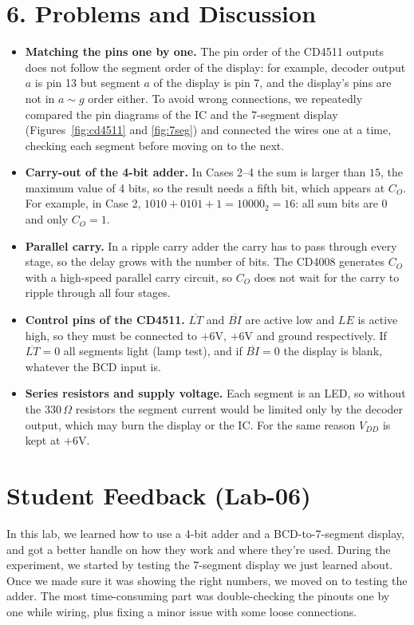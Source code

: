 \section*{6. Problems and Discussion}
\begin{itemize}[leftmargin=*]
    \item \textbf{Matching the pins one by one.} The pin order of the CD4511 outputs does not follow the segment order of the display: for example, decoder output $a$ is pin 13 but segment $a$ of the display is pin 7, and the display's pins are not in $a \sim g$ order either. To avoid wrong connections, we repeatedly compared the pin diagrams of the IC and the 7-segment display (Figures~\ref{fig:cd4511} and \ref{fig:7seg}) and connected the wires one at a time, checking each segment before moving on to the next.
    \item \textbf{Carry-out of the 4-bit adder.} In Cases 2--4 the sum is larger than $15$, the maximum value of 4 bits, so the result needs a fifth bit, which appears at $C_O$. For example, in Case 2, $1010 + 0101 + 1 = 10000_2 = 16$: all sum bits are 0 and only $C_O = 1$.
    \item \textbf{Parallel carry.} In a ripple carry adder the carry has to pass through every stage, so the delay grows with the number of bits. The CD4008 generates $C_O$ with a high-speed parallel carry circuit, so $C_O$ does not wait for the carry to ripple through all four stages.
    \item \textbf{Control pins of the CD4511.} $\overline{LT}$ and $\overline{BI}$ are active low and $LE$ is active high, so they must be connected to $+6\text{V}$, $+6\text{V}$ and ground respectively. If $\overline{LT} = 0$ all segments light (lamp test), and if $\overline{BI} = 0$ the display is blank, whatever the BCD input is.
    \item \textbf{Series resistors and supply voltage.} Each segment is an LED, so without the $330\,\Omega$ resistors the segment current would be limited only by the decoder output, which may burn the display or the IC. For the same reason $V_{DD}$ is kept at $+6\text{V}$.
\end{itemize}

\section*{Student Feedback (Lab-06)}
In this lab, we learned how to use a 4-bit adder and a BCD-to-7-segment display, and got a better handle on how they work and where they're used. During the experiment, we started by testing the 7-segment display we just learned about. Once we made sure it was showing the right numbers, we moved on to testing the adder. The most time-consuming part was double-checking the pinouts one by one while wiring, plus fixing a minor issue with some loose connections.


